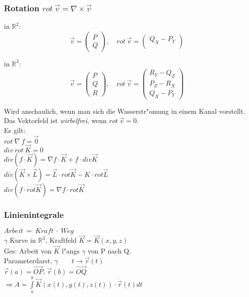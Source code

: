\documentclass[10pt, a4paper, twocolumn]{scrartcl}
\begin{document}
\subsubsection{Rotation $rot\:\vec{v}=\nabla\times\vec{v}$}

in $\mathbb{R}^2$:
$$\vec{v}=
\left (
\begin{array}{c}
 P\\
 Q
\end{array}
\right ),\quad rot\:\vec{v}=
\left (
\begin{array}{c}
 Q_X -P_Y\\
\end{array}
\right )
$$

in $\mathbb{R}^3$:
$$\vec{v}=
\left (
\begin{array}{c}
 P\\
 Q\\
 R
\end{array}
\right ),\quad rot\:\vec{v}=
\left (
\begin{array}{c}
 R_Y -Q_Z\\
 P_Z -R_X\\
 Q_X -P_Y
\end{array}
\right )
$$

Wird anschaulich, wenn man sich die Wasserstr"omung in einem Kanal vorstellt. Das Vektorfeld ist \textit{wirbelfrei}, wenn $rot\:\vec{v}=0$.\\

Es gilt:\\
$rot\:\nabla\:f=\vec{0}$\\
$div\:rot\:\vec{K}=0$\\
$div(f\cdotp \vec{K})=\nabla f\cdotp \vec{K}+f\cdotp div \vec{K}$\\
$div(\vec{K}\times\vec{L})=\vec{L}\cdotp rot\vec{K}-K\cdotp rot \vec{L}$\\
$div(f\cdotp rot \vec{K})=\nabla f\cdotp rot\vec{K}$


\subsubsection{Linienintegrale}

$Arbeit\:=\:Kraft\:\cdotp\:Weg$\\
$\gamma$ Kurve in $\mathbb{R}^3$, Kraftfeld $\vec{K}=\vec{K}(x,y,z)$\\
Ges: Arbeit von $\vec{K}$ l"angs $\gamma$ von P nach Q.\\
Parameterdarst. $\gamma\qquad t\rightarrow \vec{r}(t)$\\
$\vec{r}(a)=\overrightarrow{OP}$, $\vec{r}(b)=\overrightarrow{OQ}$\\
$\Rightarrow A=\int\limits^b_a \vec{K}(x(t),y(t),z(t))\cdotp \dot{\vec{r}}(t)dt$\\
\end{document}
